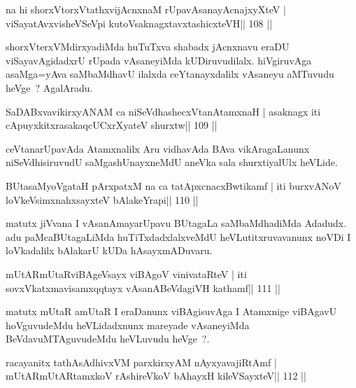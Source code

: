 \begin{shl}
na hi shorxVtorxVtathxvijAcnxnaM rUpavAsanayA\s cnajxyXteV |
viSayatAvxvisheVSeV\s pi kutoV\s saknagxtavxtashicxteVH\hfill || 108 ||
\end{shl}

\begin{artha}
shorxVterxVMdirxyadiMda huTuTxva shabadx jAcnxnavu eraDU viSayavAgidadxrU rUpada vAsaneyiMda kUDiruvudilalx. hiVgiruvAga asaMga=yAva saMbaMdhavU ilalxda ceYtanayxdalilx vAsaneyu aMTuvudu heVge~? AgalAradu.
\end{artha}

\begin{shl}
SaDABxvavikirxyANAM ca niSeVdhashecxVtanAtamxnaH |
asaknagx iti cApuyxkitxrasakaqcUCxrXyateV shurxtw\hfill || 109 ||
\end{shl}

\begin{artha}
ceVtanarUpavAda Atamxnalilx Aru vidhavAda BAva vikAragaLanunx niSeVdhisiruvudU saMgashUnayxneMdU aneVka sala shurxtiyalUlx heVLide.
\end{artha}

\begin{shl}
BUtasaMyoVgataH pArxpatxM na ca tatApxcnacxBwtikamf |
iti burxvANoV loVkeV\s simxnahxsayxteV bAlakeYrapi\hfill || 110 ||
\end{shl}

\begin{artha}
matutx jiVvana I vAsanAmayarUpavu BUtagaLa saMbaMdhadiMda Adadudx. adu paMcaBUtagaLiMda huTiTxdadxlalxveMdU heVLutitxruvavanunx noVDi I loVkadalilx bAlakarU kUDa hAsayxmADuvaru.
\end{artha}

\begin{shl}
mUtARmUtaRviBAgeV\s sayx viBAgoV vinivataRteV |
iti sovxVkatxmavisamxqqtayx vAsanABeVdagiVH kathamf\hfill || 111 ||
\end{shl}

\begin{artha}
matutx mUtaR amUtaR I eraDanunx viBAgisuvAga I Atamxnige viBAgavU hoVguvudeMdu heVLidadxnunx mareyade vAsaneyiMda BeVdavuMTAguvudeMdu heVLuvudu heVge~?.
\end{artha}


\begin{shl}
racayanitx tathA\s sAdhivxVM parxkirxyAM nAyxyavajiRtAmf |
mUtARmUtARtamxkoV rAshireVkoV bAhayxH kileVSayxteV\hfill || 112 ||
\end{shl}


